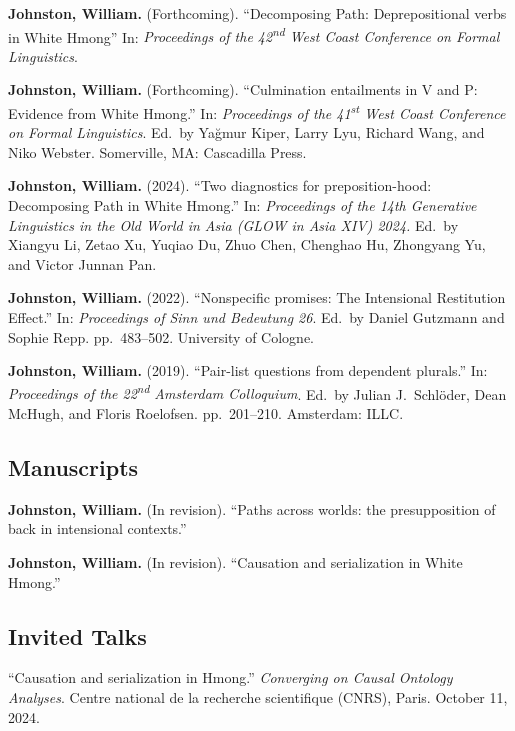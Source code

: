 \documentclass[11pt,oneside,DIV=calc,parskip=off]{scrarticle} %
\newlength{\spacingbefore}
\newlength{\spacingafter}
\newcommand{\myonecol}[1]{%
	\vspace{\spacingbefore}%
	\begin{minipage}[t]{\linewidth}%
		\strut#1%
	\end{minipage}%
	\vspace{\spacingafter}\par%
	}
\newcommand{\pub}[1]{%
	\myonecol{#1}%
	}
\newcommand{\talk}[1]{%
	\myonecol{#1}%
	}
\begin{document}
\pub{\textbf{Johnston, William.} (Forthcoming). ``Decomposing Path: Deprepositional verbs in White Hmong'' In: \textit{Proceedings of the 42\textsuperscript{nd} West Coast Conference on Formal Linguistics}. %
}
\pub{\textbf{Johnston, William.} (Forthcoming). ``Culmination entailments in V and P: Evidence from White Hmong.'' In: \textit{Proceedings of the 41\textsuperscript{st} West Coast Conference on Formal Linguistics}. Ed.\ by Yağmur Kiper, Larry Lyu, Richard Wang, and Niko Webster. Somerville, MA: Cascadilla Press.}
\pub{\textbf{Johnston, William.} (2024). ``Two diagnostics for preposition-hood: Decomposing Path in White Hmong.'' In: \emph{Proceedings of the 14th Generative Linguistics in the Old World in Asia (GLOW in Asia XIV) 2024.} Ed.\ by Xiangyu Li, Zetao Xu, Yuqiao Du, Zhuo Chen, Chenghao Hu, Zhongyang Yu, and Victor Junnan Pan.}
\pub{\textbf{Johnston, William.} (2022). ``Nonspecific promises: The Intensional Restitution Effect.'' In: \textit{Proceedings of Sinn und Bedeutung 26}. Ed.\ by Daniel Gutzmann and Sophie Repp. pp.\ 483--502. University of Cologne.}
\pub{\textbf{Johnston, William.} (2019). ``Pair-list questions from dependent plurals.'' In: \textit{Proceedings of the 22\textsuperscript{nd} Amsterdam Colloquium}. Ed.\ by Julian J.\ Schl\"oder, Dean McHugh, and Floris Roelofsen. pp.\ 201--210. Amsterdam: ILLC.}



\subsection{Manuscripts}
\pub{\textbf{Johnston, William.} (In revision). ``Paths across worlds: the presupposition of back in intensional contexts.'' %
} 

\pub{\textbf{Johnston, William.} (In revision). ``Causation and serialization in White Hmong.''} %

\subsection{Invited Talks}
\talk{``Causation and serialization in Hmong.'' \textit{Converging on Causal Ontology Analyses}. Centre national de la recherche scientifique (CNRS), Paris. October 11, 2024.}
\end{document}
